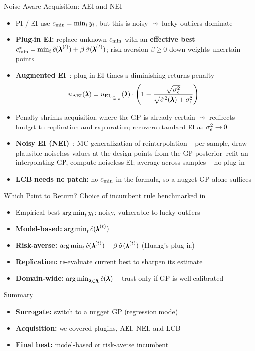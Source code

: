 \documentclass[main]{subfiles}
\begin{document}
\begin{frame}[t]{Noise-Aware Acquisition: AEI and NEI}
  \footnotesize
  \begin{itemize}
    \item PI / EI use $c_{\min} = \min_i y_i$, but this is noisy $\leadsto$ lucky outliers dominate
    \item \textbf{Plug-in EI:} replace unknown $c_{\min}$ with an \textbf{effective best}
    $c_{\min}^* = \min_t \hat{c}({\pmb{\lambda}}^{(t)}) + \beta\, \hat{\sigma}({\pmb{\lambda}}^{(t)})$; risk-aversion $\beta \ge 0$ down-weights uncertain points
    \item \textbf{Augmented EI}~: plug-in EI times a diminishing-returns penalty
    $$u_{\text{AEI}}(\pmb{\lambda}) = u_{\text{EI}_{c_{\min}^*}}(\pmb{\lambda}) \cdot \left(1 - \frac{\sqrt{\sigma_\epsilon^2}}{\sqrt{\hat{\sigma}^2(\pmb{\lambda}) + \sigma_\epsilon^2}}\right)$$
    \item Penalty shrinks acquisition where the GP is already certain $\leadsto$ redirects budget to replication and exploration; recovers standard EI as $\sigma_\epsilon^2 \to 0$
    \item \textbf{Noisy EI (NEI)}~: MC generalization of reinterpolation -- per sample, draw plausible noiseless values at the design points from the GP posterior, refit an interpolating GP, compute noiseless EI; average across samples -- no plug-in
    \item \textbf{LCB needs no patch:} no $c_{\min}$ in the formula, so a nugget GP alone suffices
  \end{itemize}
\end{frame}


\begin{frame}[t]{Which Point to Return?}
  Choice of incumbent rule benchmarked in~
  \begin{itemize}
    \item Empirical best $\operatorname*{arg\,min}_t y_t$: noisy, vulnerable to lucky outliers
    \item \textbf{Model-based:} $\operatorname*{arg\,min}_t \hat{c}({\pmb{\lambda}}^{(t)})$
    \item \textbf{Risk-averse:} $\operatorname*{arg\,min}_t \hat{c}({\pmb{\lambda}}^{(t)}) + \beta\, \hat{\sigma}({\pmb{\lambda}}^{(t)})$ (Huang's plug-in)
    \item \textbf{Replication:} re-evaluate current best to sharpen its estimate
    \item \textbf{Domain-wide:} $\operatorname*{arg\,min}_{\pmb{\lambda} \in \pmb{\Lambda}} \hat{c}(\pmb{\lambda})$ -- trust only if GP is well-calibrated
  \end{itemize}
\end{frame}


\begin{frame}[t]{Summary}
  \begin{itemize}
    \item \textbf{Surrogate:} switch to a nugget GP (regression mode)
    \item \textbf{Acquisition:} we covered plugins, AEI, NEI, and LCB
    \item \textbf{Final best:} model-based or risk-averse incumbent
  \end{itemize}
\end{frame}
\end{document}

